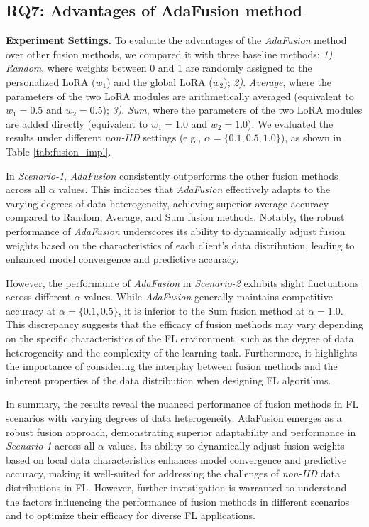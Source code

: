 \documentclass[sigconf]{acmart}
\begin{document}
\subsection{RQ7: Advantages of AdaFusion method}
\textbf{Experiment Settings.} To evaluate the advantages of the \textit{AdaFusion} method over other fusion methods, we compared it with three baseline methods: \textit{1)}. \textit{Random}, where weights between 0 and 1 are randomly assigned to the personalized LoRA ($w_1$) and the global LoRA ($w_2$); \textit{2)}. \textit{Average}, where the parameters of the two LoRA modules are arithmetically averaged (equivalent to $w_1=0. 5$ and $w_2=0.5$); \textit{3)}. \textit{Sum}, where the parameters of the two LoRA modules are added directly (equivalent to $w_1=1.0$ and $w_2=1.0$). We evaluated the results under different \textit{non-IID} settings (e.g., $\alpha=\{0.1, 0.5, 1.0\}$), as shown in Table \ref{tab:fusion_impl}.
\par
In \textit{Scenario-1}, \textit{AdaFusion} consistently outperforms the other fusion methods across all $\alpha$ values. This indicates that \textit{AdaFusion} effectively adapts to the varying degrees of data heterogeneity, achieving superior average accuracy compared to Random, Average, and Sum fusion methods. Notably, the robust performance of \textit{AdaFusion} underscores its ability to dynamically adjust fusion weights based on the characteristics of each client's data distribution, leading to enhanced model convergence and predictive accuracy.
\par
However, the performance of \textit{AdaFusion} in \textit{Scenario-2} exhibits slight fluctuations across different $\alpha$ values. While \textit{AdaFusion} generally maintains competitive accuracy at $\alpha= \{0.1, 0.5\}$,  it is inferior to the Sum fusion method at $\alpha=1.0$. This discrepancy suggests that the efficacy of fusion methods may vary depending on the specific characteristics of the FL environment, such as the degree of data heterogeneity and the complexity of the learning task. Furthermore, it highlights the importance of considering the interplay between fusion methods and the inherent properties of the data distribution when designing FL algorithms.
\par
In summary, the results reveal the nuanced performance of fusion methods in FL scenarios with varying degrees of data heterogeneity. AdaFusion emerges as a robust fusion approach, demonstrating superior adaptability and performance in \textit{Scenario-1} across all $\alpha$ values. Its ability to dynamically adjust fusion weights based on local data characteristics enhances model convergence and predictive accuracy, making it well-suited for addressing the challenges of \textit{non-IID} data distributions in FL. However, further investigation is warranted to understand the factors influencing the performance of fusion methods in different scenarios and to optimize their efficacy for diverse FL applications.
\end{document}
